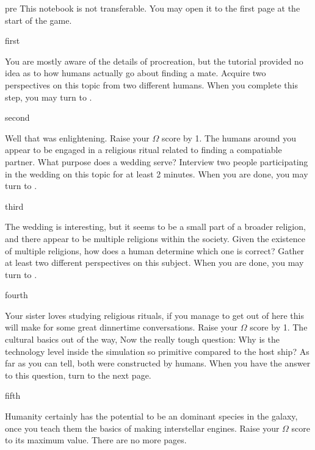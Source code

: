 \documentclass[notebook]{guildcamp1}
\begin{document}

\startnotebook{\nAlienQuestions{}}

\begin{page}{pre}
This notebook is not transferable. You may open it to the first page at the start of the game.
\end{page}

\begin{page}{first}

You are mostly aware of the details of procreation, but the tutorial provided no idea as to how humans actually go about finding a mate.
Acquire two perspectives on this topic from two different humans. When you complete this step, you may turn to .

\end{page}

\begin{page}{second}

Well that was enlightening. Raise your $\Omega$ score by 1. The humans around you appear to be engaged in a religious ritual related to
finding a compatiable partner. What purpose does a wedding serve? Interview two people participating in the wedding on
this topic for at least 2 minutes. When you are done, you may turn to .

\end{page}

\begin{page}{third}

The wedding is interesting, but it seems to be a small part of a broader religion, and there appear to be multiple religions within the society.
Given the existence of multiple religions, how does a human determine which one is correct? Gather at least two different perspectives on this subject.
When you are done, you may turn to .

\end{page}

\begin{page}{fourth}

Your sister loves studying religious rituals, if you manage to get out of here this will make for some great dinnertime conversations.
Raise your $\Omega$ score by 1. The cultural basics out of the way, Now the really tough question: 
Why is the technology level inside the simulation so primitive compared to the host ship? As far as you can tell, both were constructed by humans.
When you have the answer to this question, turn to the next page.

\end{page}

\begin{page}{fifth}

Humanity certainly has the potential to be an dominant species in the galaxy, once you teach them the basics of making interstellar engines.
Raise your $\Omega$ score to its maximum value. There are no more pages.

\end{page}

\endnotebook
\end{document}
